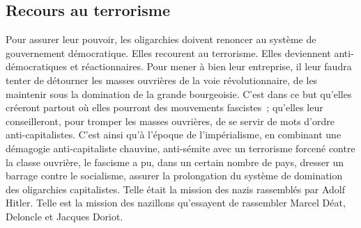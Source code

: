 \documentclass[french,twoside]{book} %
\begin{document}
\subsection[Recours au terrorisme]{Recours au terrorisme}
\noindent Pour assurer leur pouvoir, les oligarchies doivent renoncer au système de gouvernement démocratique. Elles recourent au terrorisme. Elles deviennent anti-démocratiques et réactionnaires. Pour mener à bien leur entreprise, il leur faudra tenter de détourner les masses ouvrières de la voie révolutionnaire, de les maintenir sous la domination de la grande bourgeoisie. C’est dans ce but qu’elles créeront partout où elles pourront des mouvements fascistes ; qu’elles leur conseilleront, pour tromper les masses ouvrières, de se servir de mots d’ordre anti-capitalistes. C’est ainsi qu’à l’époque de l’impérialisme, en combinant une démagogie anti-capitaliste chauvine, anti-sémite avec un terrorisme forcené contre la classe ouvrière, le fascisme a pu, dans un certain nombre de pays, dresser un barrage contre le socialisme, assurer la prolongation du système de domination des oligarchies capitalistes. Telle était la mission des nazis rassemblés par Adolf Hitler. Telle est la mission des nazillons qu’essayent de rassembler Marcel Déat, Deloncle et Jacques Doriot.
\end{document}
